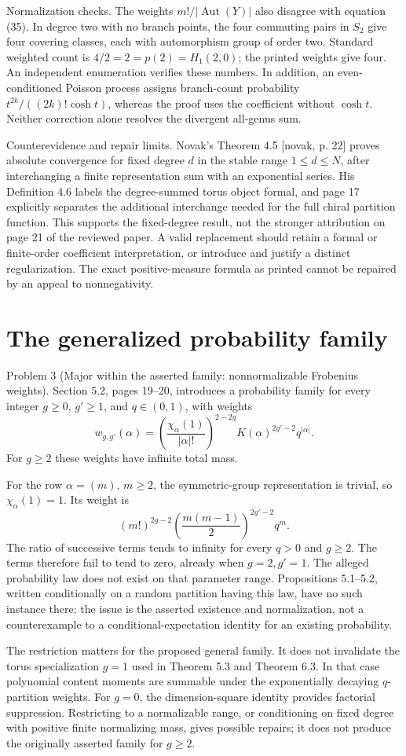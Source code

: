 \documentclass[10pt]{article}
\begin{document}
Normalization checks. The weights \(m!/|\operatorname{Aut}(Y)|\) also disagree with equation (35). In degree two with no branch points, the four commuting pairs in \(S_2\) give four covering classes, each with automorphism group of order two. Standard weighted count is \(4/2=2=p(2)=H_1(2,0)\); the printed weights give four. An independent enumeration verifies these numbers. In addition, an even-conditioned Poisson process assigns branch-count probability \(t^{2k}/((2k)!\cosh t)\), whereas the proof uses the coefficient without \(\cosh t\). Neither correction alone resolves the divergent all-genus sum.\par
Counterevidence and repair limits. Novak’s Theorem 4.5 [novak, p. 22] proves absolute convergence for fixed degree \(d\) in the stable range \(1\leq d\leq N\), after interchanging a finite representation sum with an exponential series. His Definition 4.6 labels the degree-summed torus object formal, and page 17 explicitly separates the additional interchange needed for the full chiral partition function. This supports the fixed-degree result, not the stronger attribution on page 21 of the reviewed paper. A valid replacement should retain a formal or finite-order coefficient interpretation, or introduce and justify a distinct regularization. The exact positive-measure formula as printed cannot be repaired by an appeal to nonnegativity.\par
\section*{The generalized probability family}
Problem 3 (Major within the asserted family: nonnormalizable Frobenius weights).  Section 5.2, pages 19–20, introduces a probability family for every integer \(g\geq0\), \(g'\geq1\), and \(q\in(0,1)\), with weights \[w_{g,g'}(\alpha)=
\left(\frac{\chi_\alpha(1)}{|\alpha|!}\right)^{2-2g}
K(\alpha)^{2g'-2}q^{|\alpha|}.\] For \(g\geq2\) these weights have infinite total mass.\par
For the row \(\alpha=(m)\), \(m\geq2\), the symmetric-group representation is trivial, so \(\chi_\alpha(1)=1\). Its weight is \[(m!)^{2g-2}\left(\frac{m(m-1)}2\right)^{2g'-2}q^m.\] The ratio of successive terms tends to infinity for every \(q>0\) and \(g\geq2\). The terms therefore fail to tend to zero, already when \(g=2,g'=1\). The alleged probability law does not exist on that parameter range. Propositions 5.1–5.2, written conditionally on a random partition having this law, have no such instance there; the issue is the asserted existence and normalization, not a counterexample to a conditional-expectation identity for an existing probability.\par
The restriction matters for the proposed general family. It does not invalidate the torus specialization \(g=1\) used in Theorem 5.3 and Theorem 6.3. In that case polynomial content moments are summable under the exponentially decaying \(q\)-partition weights. For \(g=0\), the dimension-square identity provides factorial suppression. Restricting to a normalizable range, or conditioning on fixed degree with positive finite normalizing mass, gives possible repairs; it does not produce the originally asserted family for \(g\geq2\).\par
\end{document}
